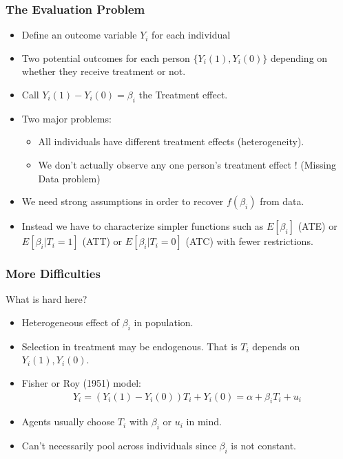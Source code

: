 \documentclass[xcolor=pdftex,dvipsnames,table,mathserif]{beamer}
\begin{document}
\begin{frame}
\frametitle{The Evaluation Problem}
\begin{itemize}
\item Define an outcome variable $Y_i$ for each individual
\item Two \alert{potential outcomes} for each person $\{Y_i(1), Y_i(0)\}$ depending on whether they receive treatment or not.
\item Call $Y_i(1)- Y_i(0) = \beta_i$ the \alert{Treatment effect}.
\item Two major problems:
\begin{itemize}
\item All individuals have different treatment effects (\alert{heterogeneity}).
\item We don't actually observe any one person's treatment effect ! (Missing Data problem)
\end{itemize}
\item We need strong assumptions in order to recover $f(\beta_i)$ from data.
\item Instead we have to characterize simpler functions such as $E[\beta_i]$ (ATE) or $E[\beta_i | T_i = 1]$ (ATT) or $E[\beta_i | T_i = 0]$ (ATC)  with fewer restrictions.
\end{itemize}
\end{frame}

\begin{frame}
\frametitle{More Difficulties}
What is hard here?
\begin{itemize}
\item Heterogeneous effect of $\beta_i$ in population.
\item Selection in treatment may be endogenous. That is $T_i$ depends on $Y_i(1),Y_i(0)$.
\item Fisher or Roy (1951) model:
\begin{eqnarray*}
Y_i = (Y_i(1) - Y_i(0)) T_i + Y_i(0)= \alpha + \beta_i T_i + u_i
\end{eqnarray*}
\item Agents usually choose $T_i$ with $\beta_i$ or $u_i$ in mind.
\item Can't necessarily pool across individuals since $\beta_i$ is not constant.
\end{itemize}
\end{frame}
\end{document}
